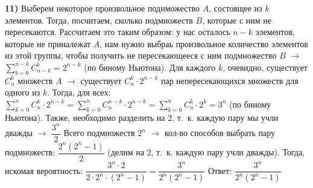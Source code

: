 \documentclass[12pt,a4paper,fleqn]{article}
\begin{document}
{\bf 11)} Выберем некоторое произвольное поднможество $A$, состоящее из $k$ элементов. Тогда, посчитаем, сколько подмножеств $B$, которые с ним не пересекаются. Рассчитаем это таким образом: у нас осталось $n - k$ элементов, которые не приналежат $A$, нам нужно выбраь произвольное количество элементов из этой группы, чтобы получить не пересекающееся с ним подмножество $B$ $\rightarrow$ $\sum_{b = 0}^{n - k}C_{n - k}^b = 2^{n - k}$ (по биному Ньютона). \newline
Для каждого $k$, очевидно, существует $C_n^k$ множеств $A$ $\rightarrow$ существует $C_n^k \cdot 2^{n - k}$ пар непересекающихся множеств для одного из $k$. Тогда, для всех: $\sum_{k = 0}^{n}C_n^k \cdot 2^{n - k} = \sum_{k = 0}^{n}C_n^{n - k} \cdot 2^{n - k} = \sum_{k = 0}^{n}C_n^k \cdot 2^k = 3^n$ (по биному Ньютона). Также, необходимо разделить на 2, т.~к. каждую пару мы учли дважды $\rightarrow$ $\dfrac{3^n}{2}$ \newline
Всего подмножеств $2^n$ $\rightarrow$ кол-во способов выбрать пару подмножеств: $\dfrac{2^n(2^n - 1)}{2}$ (делим на 2, т.~к. каждую пару учли дважды). Тогда, искомая вероятность: $\dfrac{3^n \cdot 2}{2 \cdot 2^n \cdot (2^n - 1)} = \dfrac{3^n}{2^n(2^n - 1)}$ \newline
Ответ: $\dfrac{3^n}{2^n(2^n - 1)}$
\end{document}
